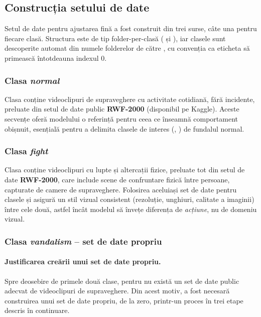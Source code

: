 \documentclass[../../main.tex]{subfiles}
\begin{document}
\subsection{Construcția setului de date}
\label{subsec:constructie_dataset}

Setul de date pentru ajustarea fină a fost construit din trei surse, câte una pentru fiecare clasă.
Structura este de tip folder-per-clasă ( și
), iar clasele sunt descoperite automat din numele folderelor de
către , cu convenția ca eticheta  să primească
întotdeauna indexul 0.

\subsubsection{Clasa \textit{normal}}
\label{subsubsec:clasa_normal}

Clasa  conține videoclipuri de supraveghere cu activitate cotidiană, fără
incidente, preluate din setul de date public \textbf{RWF-2000} (disponibil pe Kaggle). Aceste
secvențe oferă modelului o referință pentru ceea ce înseamnă comportament obișnuit, esențială
pentru a delimita clasele de interes (, ) de fundalul
normal.

\subsubsection{Clasa \textit{fight}}
\label{subsubsec:clasa_fight}

Clasa  conține videoclipuri cu lupte și altercații fizice, preluate tot din
setul de date \textbf{RWF-2000}, care include scene de confruntare fizică între persoane, capturate de
camere de supraveghere. Folosirea aceluiași set de date pentru clasele  și
 asigură un stil vizual consistent (rezoluție, unghiuri, calitate a imaginii)
între cele două, astfel încât modelul să învețe diferența de \textit{acțiune}, nu de domeniu vizual.

\subsubsection{Clasa \textit{vandalism} -- set de date propriu}
\label{subsubsec:clasa_vandalism}

\paragraph{Justificarea creării unui set de date propriu.}
\label{par:justificare_dataset}
Spre deosebire de primele două clase, pentru  nu există un set de date public
adecvat de videoclipuri de supraveghere. Din acest motiv, a fost necesară construirea unui set de
date propriu, de la zero, printr-un proces în trei etape descris în continuare.
\end{document}
